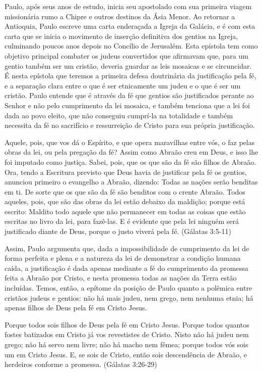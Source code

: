 \documentclass[
    article,            %
	12pt,				%
	oneside,			%
	a4paper,			%
	chapter=TITLE,		%
	section=TITLE,		%
	english,			%
	french,				%
	spanish,			%
	brazil				%
	]{abntex2}
\begin{document}
Paulo, após seus anos de estudo, inicia seu apostolado com sua primeira viagem missionária rumo a Chipre e outros destinos da Ásia Menor. Ao retornar a Antioquia, Paulo escreve uma carta enderaçada a Igreja da Galácia, e é com esta carta que se inicia o movimento de inserção definitiva dos gentios na Igreja, culminando poucos anos depois no Concílio de Jerusalém. Esta epístola tem como objetivo principal combater os judeus convertidos que afirmavam que, para um gentio também ser um cristão, deveria guardar as leis mosaicas e se circuncidar. É nesta epístola que teremos a primeira defesa doutrinária da justificação pela fé, e a separação clara entre o que é ser etnicamente um judeu e o que é ser um cristão. Paulo entende que é através da fé que gentios são justificados perante ao Senhor e não pelo cumprimento da lei mosaica, e também tenciona que a lei foi dada ao povo eleito, que não conseguiu cumprí-la na totalidade e também necessita da fé no sacrifício e ressurreição de Cristo para sua própria justificação.
\begin{citacao}
Aquele, pois, que vos dá o Espírito, e que opera maravilhas entre vós, o faz pelas obras da lei, ou pela pregação da fé? Assim como Abraão creu em Deus, e isso lhe foi imputado como justiça. Sabei, pois, que os que são da fé são filhos de Abraão. Ora, tendo a Escritura previsto que Deus havia de justificar pela fé os gentios, anunciou primeiro o evangelho a Abraão, dizendo: Todas as nações serão benditas em ti. De sorte que os que são da fé são benditos com o crente Abraão. Todos aqueles, pois, que são das obras da lei estão debaixo da maldição; porque está escrito: Maldito todo aquele que não permanecer em todas as coisas que estão escritas no livro da lei, para fazê-las. E é evidente que pela lei ninguém será justificado diante de Deus, porque o justo viverá pela fé. (Gálatas 3:5-11)
\end{citacao}
Assim, Paulo argumenta que, dada a impossibilidade de cumprimento da lei de forma perfeita e plena e a natureza da lei de demonstrar a condição humana caída, a justificação é dada apenas mediante a fé do cumprimento da promessa feita a Abraão por Cristo, e nesta promessa todas as nações da Terra estão incluídas. Temos, então, a epítome da posição de Paulo quanto a polêmica entre cristãos judeus e gentios: não há mais judeu, nem grego, nem nenhuma etnia; há apenas filhos de Deus pela fé em Cristo Jesus.
\begin{citacao}
Porque todos sois filhos de Deus pela fé em Cristo Jesus. Porque todos quantos fostes batizados em Cristo já vos revestistes de Cristo. Nisto não há judeu nem grego; não há servo nem livre; não há macho nem fêmea; porque todos vós sois um em Cristo Jesus. E, se sois de Cristo, então sois descendência de Abraão, e herdeiros conforme a promessa. (Gálatas 3:26-29)
\end{citacao}
\end{document}
